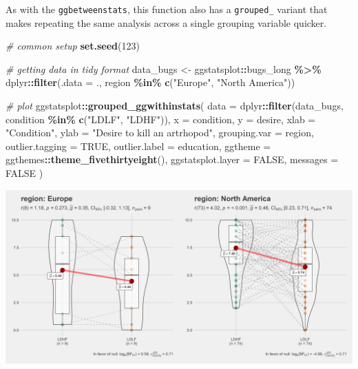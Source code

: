 \documentclass[
]{article}
\newenvironment{Shaded}{\begin{snugshade}}{\end{snugshade}}
\newcommand{\CommentTok}[1]{\textcolor[rgb]{0.56,0.35,0.01}{\textit{#1}}}
\newcommand{\DataTypeTok}[1]{\textcolor[rgb]{0.13,0.29,0.53}{#1}}
\newcommand{\DecValTok}[1]{\textcolor[rgb]{0.00,0.00,0.81}{#1}}
\newcommand{\KeywordTok}[1]{\textcolor[rgb]{0.13,0.29,0.53}{\textbf{#1}}}
\newcommand{\NormalTok}[1]{#1}
\newcommand{\OperatorTok}[1]{\textcolor[rgb]{0.81,0.36,0.00}{\textbf{#1}}}
\newcommand{\OtherTok}[1]{\textcolor[rgb]{0.56,0.35,0.01}{#1}}
\newcommand{\StringTok}[1]{\textcolor[rgb]{0.31,0.60,0.02}{#1}}
\begin{document}
As with the \texttt{ggbetweenstats}, this function also has a \texttt{grouped\_} variant that
makes repeating the same analysis across a single grouping variable quicker.

\begin{Shaded}
\begin{Highlighting}[]
\CommentTok{\# common setup}
\KeywordTok{set.seed}\NormalTok{(}\DecValTok{123}\NormalTok{)}

\CommentTok{\# getting data in tidy format}
\NormalTok{data\_bugs <{-}}\StringTok{ }\NormalTok{ggstatsplot}\OperatorTok{::}\NormalTok{bugs\_long }\OperatorTok{\%>\%}
\StringTok{  }\NormalTok{dplyr}\OperatorTok{::}\KeywordTok{filter}\NormalTok{(}\DataTypeTok{.data =}\NormalTok{ ., region }\OperatorTok{\%in\%}\StringTok{ }\KeywordTok{c}\NormalTok{(}\StringTok{"Europe"}\NormalTok{, }\StringTok{"North America"}\NormalTok{))}

\CommentTok{\# plot}
\NormalTok{ggstatsplot}\OperatorTok{::}\KeywordTok{grouped\_ggwithinstats}\NormalTok{(}
  \DataTypeTok{data =}\NormalTok{ dplyr}\OperatorTok{::}\KeywordTok{filter}\NormalTok{(data\_bugs, condition }\OperatorTok{\%in\%}\StringTok{ }\KeywordTok{c}\NormalTok{(}\StringTok{"LDLF"}\NormalTok{, }\StringTok{"LDHF"}\NormalTok{)),}
  \DataTypeTok{x =}\NormalTok{ condition,}
  \DataTypeTok{y =}\NormalTok{ desire,}
  \DataTypeTok{xlab =} \StringTok{"Condition"}\NormalTok{,}
  \DataTypeTok{ylab =} \StringTok{"Desire to kill an artrhopod"}\NormalTok{,}
  \DataTypeTok{grouping.var =}\NormalTok{ region,}
  \DataTypeTok{outlier.tagging =} \OtherTok{TRUE}\NormalTok{,}
  \DataTypeTok{outlier.label =}\NormalTok{ education,}
  \DataTypeTok{ggtheme =}\NormalTok{ ggthemes}\OperatorTok{::}\KeywordTok{theme\_fivethirtyeight}\NormalTok{(),}
  \DataTypeTok{ggstatsplot.layer =} \OtherTok{FALSE}\NormalTok{,}
  \DataTypeTok{messages =} \OtherTok{FALSE}
\NormalTok{)}
\end{Highlighting}
\end{Shaded}

\includegraphics[width=1\linewidth]{./figures/paper-ggwithinstats2-1}
\end{document}
